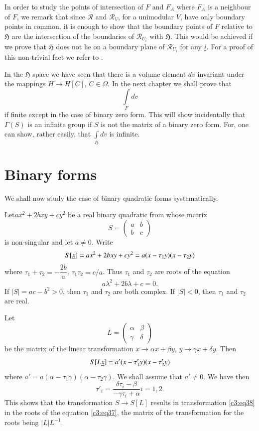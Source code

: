 In order to study the points of intersection of $F$ and $F_{A}$ where
$F_{A}$ is a neighbour of $F$, we remark that since $\mathscr{R}$ and
$\mathscr{R}_{V}$, for a unimodular $V$, have only boundary points in
common, it is enough to show that the boundary points of $F$ relative
to $\mathfrak{H}$ are the intersection of the boundaries of
$\mathscr{R}_{U_{i}}$ with $\mathfrak{H}$. This would be achieved if
we prove that $\mathfrak{H}$ does not lie on a boundary plane of
$\mathscr{R}_{U_{i}}$ for any $\underline{i}$. For a proof of this
non-trivial fact we refer to \cite{c3:key8}.

In the $\mathfrak{H}$ space we have seen that there is a volume
element $dv$ invariant under the mappings $H\to H[C]$,
$C\in\Omega$. In the next chapter we shall prove that
\begin{equation*}
\int\limits_{F}dv\tag{36}\label{c3:eq36}
\end{equation*}
if finite except in the case of binary zero form. This will show
incidentally that $\Gamma(S)$ is an infinite group if $S$ is not the
matrix of a binary zero form. For, one can show, rather easily, that
$\int\limits_{\mathfrak{H}}dv$ is infinite.


\section{Binary forms}\label{chap3:sec5}

We shall now study the case of binary quadratic forms systematically.

Let\pageoriginale $ax^{2}+2bxy+cy^{2}$ be a real binary quadratic from
whose matrix
$$
S=
\begin{pmatrix}
a & b\\
b & c
\end{pmatrix}
$$
is non-singular and let $a\neq 0$. Write
$$
S[\underline{x}]=ax^{2}+2bxy+cy^{2}=a(x-\tau_{1}y)(x-\tau_{2}y)
$$
where $\tau_{1}+\tau_{2}=-\dfrac{2b}{a}$, $\tau_{1}\tau_{2}=c/a$. Thus
$\tau_{1}$ and $\tau_{2}$ are roots of the equation
\begin{equation*}
a\lambda^{2}+2b\lambda+c=0.\tag{37}\label{c3:eq37}
\end{equation*}
If $|S|=ac-b^{2}>0$, then $\tau_{1}$ and $\tau_{2}$ are both
complex. If $|S|<0$, then $\tau_{1}$ and $\tau_{2}$ are real.

Let 
$$
L=
\begin{pmatrix}
\alpha & \beta\\
\gamma & \delta
\end{pmatrix}
$$
be the matrix of the linear transformation $x\to \alpha x+\beta y$,
$y\to\gamma x+\delta y$. Then
$$
S[L\underline{x}]=a'(x-\tau'_{1}y)(x-\tau'_{2}y)
$$
where $a'=a(\alpha-\tau_{1}\gamma)(\alpha-\tau_{2}\gamma)$. We shall
assume that $a'\neq 0$. We have then
\begin{equation*}
\tau'_{i} = \frac{\delta\tau_{i}-\beta}{-\gamma\tau_{i}
+\alpha}i=1,2.\tag{38}\label{c3:eq38} 
\end{equation*}
This shows that the transformation $S\to S[L]$ results in
transformation \eqref{c3:eq38} in the roots of the equation \eqref{c3:eq37}, the
matrix of the transformation for the roots being $|L|L^{-1}$.

